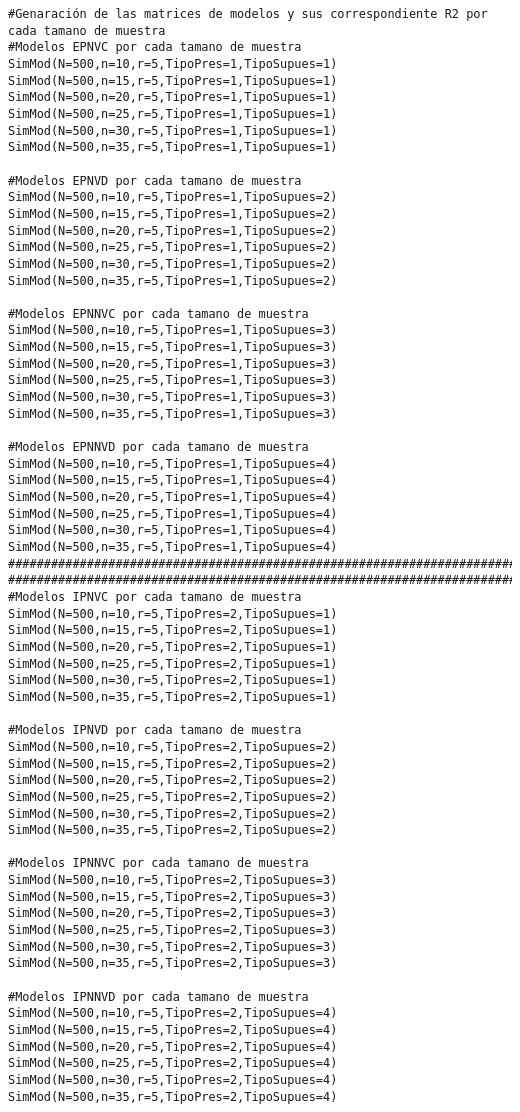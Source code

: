 \begin{verbatim}
#Genaración de las matrices de modelos y sus correspondiente R2 por cada tamano de muestra
#Modelos EPNVC por cada tamano de muestra
SimMod(N=500,n=10,r=5,TipoPres=1,TipoSupues=1)
SimMod(N=500,n=15,r=5,TipoPres=1,TipoSupues=1)
SimMod(N=500,n=20,r=5,TipoPres=1,TipoSupues=1)
SimMod(N=500,n=25,r=5,TipoPres=1,TipoSupues=1)
SimMod(N=500,n=30,r=5,TipoPres=1,TipoSupues=1)
SimMod(N=500,n=35,r=5,TipoPres=1,TipoSupues=1)

#Modelos EPNVD por cada tamano de muestra
SimMod(N=500,n=10,r=5,TipoPres=1,TipoSupues=2)
SimMod(N=500,n=15,r=5,TipoPres=1,TipoSupues=2)
SimMod(N=500,n=20,r=5,TipoPres=1,TipoSupues=2)
SimMod(N=500,n=25,r=5,TipoPres=1,TipoSupues=2)
SimMod(N=500,n=30,r=5,TipoPres=1,TipoSupues=2)
SimMod(N=500,n=35,r=5,TipoPres=1,TipoSupues=2)

#Modelos EPNNVC por cada tamano de muestra
SimMod(N=500,n=10,r=5,TipoPres=1,TipoSupues=3)
SimMod(N=500,n=15,r=5,TipoPres=1,TipoSupues=3)
SimMod(N=500,n=20,r=5,TipoPres=1,TipoSupues=3)
SimMod(N=500,n=25,r=5,TipoPres=1,TipoSupues=3)
SimMod(N=500,n=30,r=5,TipoPres=1,TipoSupues=3)
SimMod(N=500,n=35,r=5,TipoPres=1,TipoSupues=3)

#Modelos EPNNVD por cada tamano de muestra
SimMod(N=500,n=10,r=5,TipoPres=1,TipoSupues=4)
SimMod(N=500,n=15,r=5,TipoPres=1,TipoSupues=4)
SimMod(N=500,n=20,r=5,TipoPres=1,TipoSupues=4)
SimMod(N=500,n=25,r=5,TipoPres=1,TipoSupues=4)
SimMod(N=500,n=30,r=5,TipoPres=1,TipoSupues=4)
SimMod(N=500,n=35,r=5,TipoPres=1,TipoSupues=4)
################################################################################
################################################################################
#Modelos IPNVC por cada tamano de muestra
SimMod(N=500,n=10,r=5,TipoPres=2,TipoSupues=1)
SimMod(N=500,n=15,r=5,TipoPres=2,TipoSupues=1)
SimMod(N=500,n=20,r=5,TipoPres=2,TipoSupues=1)
SimMod(N=500,n=25,r=5,TipoPres=2,TipoSupues=1)
SimMod(N=500,n=30,r=5,TipoPres=2,TipoSupues=1)
SimMod(N=500,n=35,r=5,TipoPres=2,TipoSupues=1)

#Modelos IPNVD por cada tamano de muestra
SimMod(N=500,n=10,r=5,TipoPres=2,TipoSupues=2)
SimMod(N=500,n=15,r=5,TipoPres=2,TipoSupues=2)
SimMod(N=500,n=20,r=5,TipoPres=2,TipoSupues=2)
SimMod(N=500,n=25,r=5,TipoPres=2,TipoSupues=2)
SimMod(N=500,n=30,r=5,TipoPres=2,TipoSupues=2)
SimMod(N=500,n=35,r=5,TipoPres=2,TipoSupues=2)

#Modelos IPNNVC por cada tamano de muestra
SimMod(N=500,n=10,r=5,TipoPres=2,TipoSupues=3)
SimMod(N=500,n=15,r=5,TipoPres=2,TipoSupues=3)
SimMod(N=500,n=20,r=5,TipoPres=2,TipoSupues=3)
SimMod(N=500,n=25,r=5,TipoPres=2,TipoSupues=3)
SimMod(N=500,n=30,r=5,TipoPres=2,TipoSupues=3)
SimMod(N=500,n=35,r=5,TipoPres=2,TipoSupues=3)

#Modelos IPNNVD por cada tamano de muestra
SimMod(N=500,n=10,r=5,TipoPres=2,TipoSupues=4)
SimMod(N=500,n=15,r=5,TipoPres=2,TipoSupues=4)
SimMod(N=500,n=20,r=5,TipoPres=2,TipoSupues=4)
SimMod(N=500,n=25,r=5,TipoPres=2,TipoSupues=4)
SimMod(N=500,n=30,r=5,TipoPres=2,TipoSupues=4)
SimMod(N=500,n=35,r=5,TipoPres=2,TipoSupues=4)
\end{verbatim}




